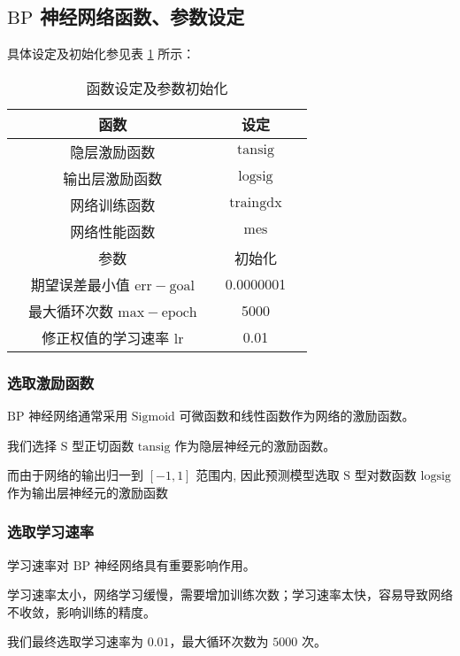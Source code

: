 \subsection{$\mathrm{BP}$ 神经网络函数、参数设定}

  具体设定及初始化参见表 \ref{tab:shedingchushihua} 所示：
  \begin{table}[thb]
    \caption{函数设定及参数初始化}
    \label{tab:shedingchushihua}
    \centering
    \begin{tabular*}{0.8\textwidth}{@{\extracolsep{\fill}}ccccc}
      \toprule[1.5pt]
      &函数 && 设定 &\\
      \midrule[1pt]
      &隐层激励函数 && $\mathrm{tansig}$ &\\
      &输出层激励函数 && $\mathrm{logsig}$ &\\
      &网络训练函数 && $\mathrm{traingdx}$ &\\
      &网络性能函数 && $\mathrm{mes}$ &\\
      \bottomrule[1.5pt]
      &参数 && 初始化 &\\
      \midrule[1pt]
      &期望误差最小值 $\mathrm{err-goal}$ && 0.0000001 &\\
      &最大循环次数 $\mathrm{max-epoch}$ && 5000 &\\
      &修正权值的学习速率 $\mathrm{lr}$ && 0.01 &\\
      \bottomrule[1.5pt]
    \end{tabular*}
  \end{table}

  \subsubsection{选取激励函数}

    $\mathrm{BP}$ 神经网络通常采用 $\mathrm{Sigmoid}$ 可微函数和线性函数作为网络的激励函数。

    我们选择 $\mathrm{S}$ 型正切函数 $\mathrm{tansig}$ 作为隐层神经元的激励函数。

    而由于网络的输出归一到 $\left[ -1, 1 \right]$ 范围内, 因此预测模型选取 $\mathrm{S}$ 型对数函数 $\mathrm{logsig}$ 作为输出层神经元的激励函数

  \subsubsection{选取学习速率}

    学习速率对 $\mathrm{BP}$ 神经网络具有重要影响作用。

    学习速率太小，网络学习缓慢，需要增加训练次数；学习速率太快，容易导致网络不收敛，影响训练的精度。

    我们最终选取学习速率为 $0.01$，最大循环次数为 $5000$ 次。